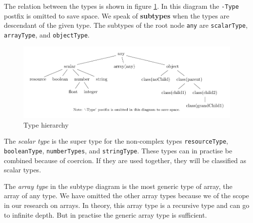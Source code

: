 \documentclass[../main.tex]{subfiles}
\begin{document}
    The relation between the types is shown in figure \ref{fig:type_hierarchie}.
    In this diagram the \texttt{-Type} postfix is omitted to save space.
    We speak of \textbf{subtypes} when the types are descendant of the given type.
    The subtypes of the root node \texttt{any} are \texttt{scalarType}, \texttt{arrayType}, and \texttt{objectType}.
    
    \begin{figure}[H]
        \includegraphics{Diagrams/Subtypes.pdf}
        \caption{Type hierarchy}
        \label{fig:type_hierarchie}
    \end{figure}
    

    The \textit{scalar type} is the super type for the non-complex types \texttt{resourceType}, \texttt{booleanType}, \texttt{numberTypes}, and \texttt{stringType}.
    These types can in practise be combined because of coercion.
    If they are used together, they will be classified as scalar types.
    
	The \textit{array type} in the subtype diagram is the most generic type of array, the array of any type.
	We have omitted the other array types because we of the scope in our research on arrays.
	In theory, this array type is a recursive type and can go to infinite depth.
	But in practise the generic array type is sufficient. 
 
\end{document}
